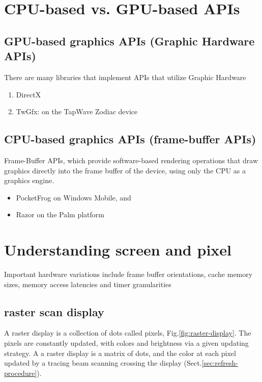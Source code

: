 \section{CPU-based vs. GPU-based APIs}

\subsection{GPU-based graphics APIs (Graphic Hardware APIs)}

There are many libraries that implement APIs that utilize Graphic Hardware
\begin{enumerate}
  \item DirectX
  
  \item  TwGfx: on the TapWave Zodiac device
\end{enumerate} 

\subsection{CPU-based graphics APIs (frame-buffer APIs)}
\label{sec:Frame-Buffer-API}

 
Frame-Buffer  APIs,  which  provide  software-based rendering  operations  that 
draw  graphics  directly  into  the  frame buffer  of  the  device,  using  only
 the  CPU  as  a  graphics  engine.
\begin{itemize}
  \item  PocketFrog  on  Windows  Mobile,  and  
  
  \item Razor  on the Palm platform
\end{itemize}


\section{Understanding screen and pixel}

Important   hardware   variations   include   frame   buffer  orientations,
cache  memory  sizes,  memory  access  latencies  and timer  granularities

\subsection{raster scan display}
\label{sec:raster-screen}


A raster display is a collection of dots called pixels,
Fig.\ref{fig:raster-display}. The pixels are constantly updated, with colors and
brightness via a given updating strategy.
A a raster display is a matrix of dots, and the color at each pixel updated by a
tracing beam scanning crossing the display (Sect.\ref{sec:refresh-procedure}).

